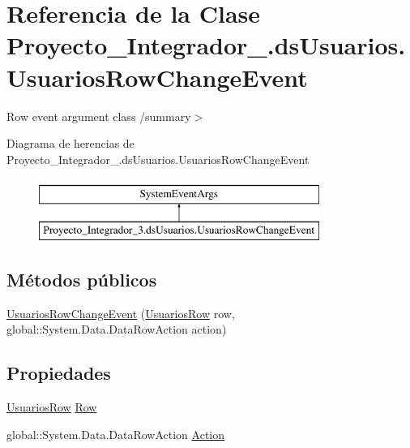 \hypertarget{class_proyecto___integrador__3_1_1ds_usuarios_1_1_usuarios_row_change_event}{\section{Referencia de la Clase Proyecto\-\_\-\-Integrador\-\_.\-ds\-Usuarios.\-Usuarios\-Row\-Change\-Event}
\label{class_proyecto___integrador__3_1_1ds_usuarios_1_1_usuarios_row_change_event}
}


Row event argument class /summary$>$  


Diagrama de herencias de Proyecto\-\_\-\-Integrador\-\_.\-ds\-Usuarios.\-Usuarios\-Row\-Change\-Event\begin{figure}[H]
\begin{center}
\leavevmode
\includegraphics[height=2.000000cm]{d0/daf/class_proyecto___integrador__3_1_1ds_usuarios_1_1_usuarios_row_change_event}
\end{center}
\end{figure}
\subsection*{Métodos públicos}
\begin{DoxyCompactItemize}
\item 
\hyperlink{class_proyecto___integrador__3_1_1ds_usuarios_1_1_usuarios_row_change_event_a2bb91a739acbdbba94b0c5d878fa93e4}{Usuarios\-Row\-Change\-Event} (\hyperlink{class_proyecto___integrador__3_1_1ds_usuarios_1_1_usuarios_row}{Usuarios\-Row} row, global\-::\-System.\-Data.\-Data\-Row\-Action action)
\end{DoxyCompactItemize}
\subsection*{Propiedades}
\begin{DoxyCompactItemize}
\item 
\hyperlink{class_proyecto___integrador__3_1_1ds_usuarios_1_1_usuarios_row}{Usuarios\-Row} \hyperlink{class_proyecto___integrador__3_1_1ds_usuarios_1_1_usuarios_row_change_event_a826214dc22ebf1a596d46c1e6f19848c}{Row}
\item 
global\-::\-System.\-Data.\-Data\-Row\-Action \hyperlink{class_proyecto___integrador__3_1_1ds_usuarios_1_1_usuarios_row_change_event_a999538fbd2ec0d0947e4cf96b2eb55a7}{Action}
\end{DoxyCompactItemize}
